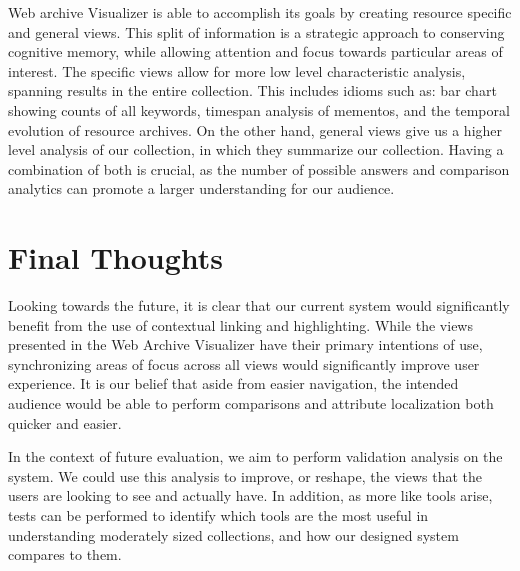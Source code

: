 \documentclass[10pt,journal,compsoc]{IEEEtran}
\begin{document}
Web archive Visualizer is able to accomplish its goals by creating resource specific and general views. This split of information is a strategic approach to conserving cognitive memory, while allowing attention and focus towards particular areas of interest. The specific views allow for more low level characteristic analysis, spanning results in the entire collection. This includes idioms such as: bar chart showing counts of all keywords, timespan analysis of mementos, and the temporal evolution of resource archives. On the other hand, general views give us a higher level analysis of our collection, in which they summarize our collection. Having a combination of both is crucial, as the number of possible answers and comparison analytics can promote a larger understanding for our audience. \par

\section{Final Thoughts}
Looking towards the future, it is clear that our current system would significantly benefit from the use of contextual linking and highlighting. While the views presented in the Web Archive Visualizer have their primary intentions of use, synchronizing areas of focus across all views would significantly improve user experience. It is our belief that aside from easier navigation, the intended audience would be able to perform comparisons and attribute localization both quicker and easier. \par

In the context of future evaluation, we aim to perform validation analysis on the system. We could use this analysis to improve, or reshape, the views that the users are looking to see and actually have. In addition, as more like tools arise, tests can be performed to identify which tools are the most useful in understanding moderately sized collections, and how our designed system compares to them. \par


\ifCLASSOPTIONcaptionsoff
  \newpage
\fi




{}


%
%
\end{document}
